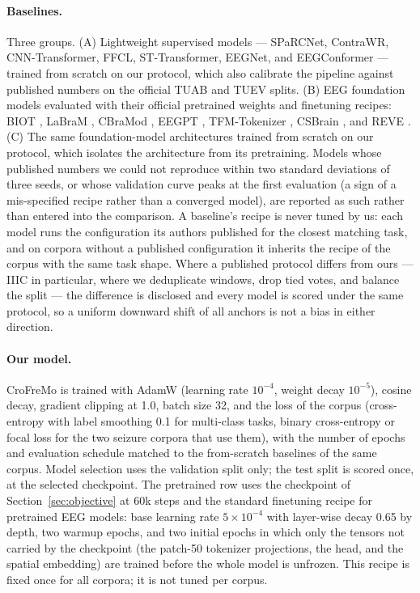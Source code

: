 \paragraph{Baselines.}
Three groups. (A) Lightweight supervised models --- SPaRCNet, ContraWR,
CNN-Transformer, FFCL, ST-Transformer, EEGNet, and EEGConformer --- trained
from scratch on our protocol, which also calibrate the pipeline against
published numbers on the official TUAB and TUEV splits. (B) EEG foundation
models evaluated with their official pretrained weights and finetuning
recipes: BIOT \citep{yang2023biot}, LaBraM \citep{jiang2024labram}, CBraMod
\citep{wang2025cbramod}, EEGPT \citep{wang2024eegpt}, TFM-Tokenizer
\citep{pradeepkumar2026tfm}, CSBrain \citep{zhou2025csbrain}, and REVE
\citep{bertrand2025reve}. (C) The same foundation-model architectures
trained from scratch on our protocol, which isolates the architecture from
its pretraining. Models whose published numbers we could not reproduce
within two standard deviations of three seeds, or whose validation curve
peaks at the first evaluation (a sign of a mis-specified recipe rather than
a converged model), are reported as such rather than entered into the
comparison. A baseline's recipe is never tuned by us: each model runs the
configuration its authors published for the closest matching task, and on
corpora without a published configuration it inherits the recipe of the
corpus with the same task shape. Where a published protocol differs from
ours --- IIIC in particular, where we deduplicate windows, drop tied votes,
and balance the split --- the difference is disclosed and every model is
scored under the same protocol, so a uniform downward shift of all anchors
is not a bias in either direction.

\paragraph{Our model.}
CroFreMo is trained with AdamW (learning rate $10^{-4}$, weight decay
$10^{-5}$), cosine decay, gradient clipping at 1.0, batch size 32, and the
loss of the corpus (cross-entropy with label smoothing 0.1 for multi-class
tasks, binary cross-entropy or focal loss for the two seizure corpora that
use them), with the number of epochs and evaluation schedule matched to the
from-scratch baselines of the same corpus. Model selection uses the
validation split only; the test split is scored once, at the selected
checkpoint. The pretrained row uses the checkpoint of
Section~\ref{sec:objective} at 60k steps and the standard finetuning recipe
for pretrained EEG models: base learning rate $5\times10^{-4}$ with
layer-wise decay 0.65 by depth, two warmup epochs, and two initial epochs in
which only the tensors not carried by the checkpoint (the patch-50 tokenizer
projections, the head, and the spatial embedding) are trained before the
whole model is unfrozen. This recipe is fixed once for all corpora; it is
not tuned per corpus.

